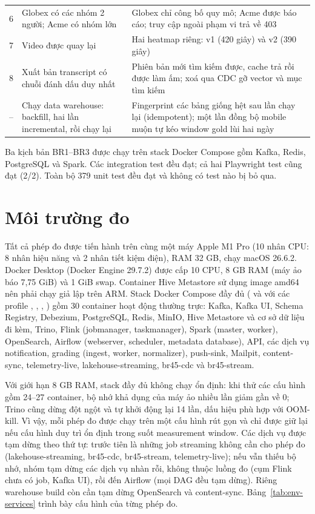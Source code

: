 {\begin{longtable}{@{}L{0.9cm}L{6.0cm}L{7.6cm}@{}}
6 & Globex có các nhóm 2 người; Acme có nhóm lớn & Globex chỉ công bố quy mô; Acme được báo cáo; truy cập ngoài phạm vi trả về 403 \\
7 & Video  được quay lại & Hai heatmap riêng: v1 (420 giây) và v2 (390 giây) \\
8 & Xuất bản transcript có chuỗi đánh dấu duy nhất & Phiên bản mới tìm kiếm được, cache trả  rồi được làm ấm; xoá qua CDC gỡ vector và mục tìm kiếm \\
-- & Chạy data warehouse: backfill, hai lần incremental, rồi chạy lại & Fingerprint các bảng giống hệt sau lần chạy lại (idempotent); một lần đồng bộ mobile muộn tự kéo window gold lùi hai ngày \\
\bottomrule
\end{longtable}}

Ba kịch bản BR1--BR3 được chạy trên stack Docker Compose gồm Kafka, Redis, PostgreSQL và Spark. Các integration test đều đạt; cả hai Playwright test cũng đạt (2/2). Toàn bộ 379 unit test đều đạt và không có test nào bị bỏ qua.

\section{Môi trường đo}
\label{sec:env}

Tất cả phép đo được tiến hành trên cùng một máy Apple M1 Pro (10 nhân CPU: 8 nhân hiệu năng và 2 nhân tiết kiệm điện), RAM 32 GB, chạy macOS 26.6.2. Docker Desktop (Docker Engine 29.7.2) được cấp 10 CPU, 8 GB RAM (máy ảo báo 7,75 GiB) và 1 GiB swap. Container Hive Metastore sử dụng image amd64 nên phải chạy giả lập trên ARM. Stack Docker Compose đầy đủ ( và  với các profile , , , ) gồm 30 container hoạt động thường trực: Kafka, Kafka UI, Schema Registry, Debezium, PostgreSQL, Redis, MinIO, Hive Metastore và cơ sở dữ liệu đi kèm, Trino, Flink (jobmanager, taskmanager), Spark (master, worker), OpenSearch, Airflow (webserver, scheduler, metadata database), API, các dịch vụ notification, grading (ingest, worker, normalizer), push-sink, Mailpit, content-sync, telemetry-live, lakehouse-streaming, br45-cdc và br45-stream.

Với giới hạn 8 GB RAM, stack đầy đủ không chạy ổn định: khi thử các cấu hình gồm 24--27 container, bộ nhớ khả dụng của máy ảo nhiều lần giảm gần về 0; Trino cũng dừng đột ngột và tự khởi động lại 14 lần, dấu hiệu phù hợp với OOM-kill. Vì vậy, mỗi phép đo được chạy trên một cấu hình rút gọn và chỉ được giữ lại nếu cấu hình duy trì ổn định trong suốt measurement window. Các dịch vụ được tạm dừng theo thứ tự: trước tiên là những job streaming không cần cho phép đo (lakehouse-streaming, br45-cdc, br45-stream, telemetry-live); nếu vẫn thiếu bộ nhớ, nhóm tạm dừng các dịch vụ nhàn rỗi, không thuộc luồng đo (cụm Flink chưa có job, Kafka UI), rồi đến Airflow (mọi DAG đều tạm dừng). Riêng warehouse build còn cần tạm dừng OpenSearch và content-sync. Bảng~\ref{tab:env-services} trình bày cấu hình của từng phép đo.

